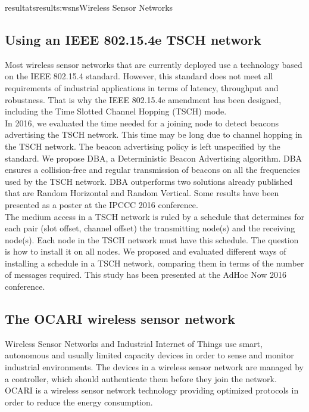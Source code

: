 \documentclass{ra2016}
\begin{document}
\begin{module}{resultats}{results:wsns}{Wireless Sensor Networks}
\subsection{Using an IEEE 802.15.4e TSCH network}

Most wireless sensor networks that are currently deployed use a technology based on the IEEE 802.15.4 standard. However, this standard does not meet all requirements of industrial applications in terms of latency, throughput and robustness. That is why the IEEE 802.15.4e amendment has been designed, including the Time Slotted Channel Hopping (TSCH) mode. \\

In 2016, we evaluated the time needed for a joining node to detect beacons advertising the TSCH network. This time may be long due to channel hopping in the TSCH network. The beacon advertising policy is left unspecified by the standard. We propose DBA, a Deterministic Beacon Advertising algorithm. DBA ensures a collision-free and regular transmission of beacons on all the frequencies used by the TSCH network. DBA outperforms two solutions already published that are Random Horizontal and Random Vertical. Some results have been presented as a poster at the IPCCC 2016 conference.\\

The medium access in a TSCH network is ruled by a schedule that determines for each pair (slot offset, channel offset) the transmitting node(s) and the receiving node(s). Each node in the TSCH network must have this schedule. The question is how to install it on all nodes. We proposed and evaluated different ways of installing a schedule in a TSCH network, comparing them in terms of the number of messages required. This study has been presented at the AdHoc Now 2016 conference.\\

\subsection{The OCARI wireless sensor network}

Wireless Sensor Networks and Industrial Internet
of Things use smart, autonomous and usually limited capacity
devices in order to sense and monitor industrial environments.
The devices in a wireless sensor network are managed by a
controller, which should authenticate them before they join
the network. OCARI is a wireless sensor network technology
providing optimized protocols in order to reduce the energy
consumption.\\ 


\end{module}
\end{document}
